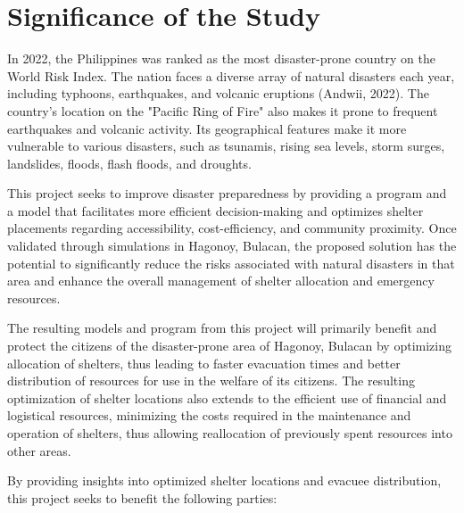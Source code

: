 \section{Significance of the Study}

In 2022, the Philippines was ranked as the most disaster-prone country on the World Risk Index. The nation faces a diverse array of natural disasters each year, including typhoons, earthquakes, and volcanic eruptions (Andwii, 2022). The country's location on the "Pacific Ring of Fire" also makes it prone to frequent earthquakes and volcanic activity. Its geographical features make it more vulnerable to various disasters, such as tsunamis, rising sea levels, storm surges, landslides, floods, flash floods, and droughts.

This project seeks to improve disaster preparedness by providing a program and a model that facilitates more efficient decision-making and optimizes shelter placements regarding accessibility, cost-efficiency, and community proximity. Once validated through simulations in Hagonoy, Bulacan, the proposed solution has the potential to significantly reduce the risks associated with natural disasters in that area and enhance the overall management of shelter allocation and emergency resources.

The resulting models and program from this project will primarily benefit and protect the citizens of the disaster-prone area of Hagonoy, Bulacan by optimizing allocation of shelters, thus leading to faster evacuation times and better distribution of resources for use in the welfare of its citizens. The resulting optimization of shelter locations also extends to the efficient use of financial and logistical resources, minimizing the costs required in the maintenance and operation of shelters, thus allowing reallocation of previously spent resources into other areas.

By providing insights into optimized shelter locations and evacuee distribution, this project seeks to benefit the following parties:

